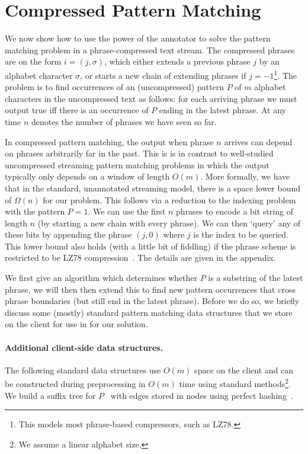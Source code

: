 \section{Compressed Pattern Matching}
We now show how to use the power of the annotator to solve the pattern matching problem in a phrase-compressed text stream. The compressed phrases are on the form $i = (j, \sigma)$, which either extends a previous phrase $j$ by an alphabet character $\sigma$, or starts a new chain of extending phrases if $j = -1$\footnote{This models most phrase-based compressors, such as LZ78.}. 
    The problem is to find occurrences of an (uncompressed) pattern $P$ of $m$ alphabet characters in the uncompressed text as follows: for each arriving phrase we must output true iff there is an occurrence of $P$ ending in the latest phrase. At any time $n$ denotes the number of phrases we have seen so far. 
   
In compressed pattern matching, the output when phrase $n$ arrives can depend on phrases arbitrarily far in the past. This is is in contrast to well-studied uncompressed streaming pattern matching problems in which the output typically only depends on a window of length $O(m)$. More formally, we have that in the standard, unannotated streaming model, there is a space lower bound of $\Omega(n)$ for our problem. This follows via a reduction to the indexing problem with the pattern $P=1$. We can use the first $n$ phrases to encode a bit string of length $n$ (by starting a new chain with every phrase). We can then `query' any of these bits by appending the phrase $(j,0)$ where $j$ is the index to be queried. This lower bound also holds (with a little bit of fiddling) if the phrase scheme is restricted to be LZ78 compression~\cite{lz78}. The details are given in the appendix.


We first give an algorithm which determines whether $P$ is a substring of the latest phrase, we will then then extend this to find new pattern occurrences that cross phrase boundaries (but still end in the latest phrase). Before we do so, we briefly discuss some (mostly) standard pattern matching data structures that we store on the client for use in for our solution.

\paragraph{Additional client-side data structures.} The following standard data structures use $O(m)$ space on the client and can be constructed during preprocessing in $O(m)$ time using standard methods\footnote{We assume a linear alphabet size.}. We build a suffix tree for $P$~\cite{Weiner1973} with edges stored in nodes using perfect hashing~\cite{fredman1984storing}. %

